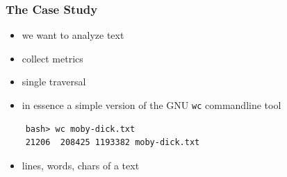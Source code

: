 \documentclass[aspectratio=169]{beamer}
\begin{document}
\begin{frame}[fragile]
  \frametitle{The Case Study}
  \begin{itemize}
  \item we want to analyze text
  \item collect metrics
  \item single traversal
  \item in essence a simple version of the GNU \texttt{wc} commandline tool
  \end{itemize}
  \begin{verbatim}
    bash> wc moby-dick.txt
    21206  208425 1193382 moby-dick.txt
  \end{verbatim}
  \begin{itemize}
  \item lines, words, chars of a text
  \end{itemize}
\end{frame}
\end{document}
